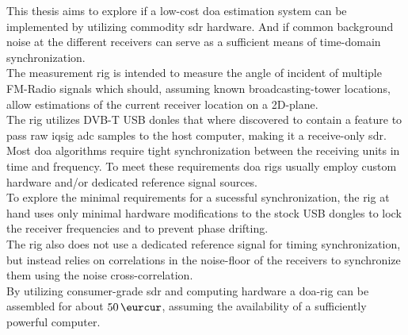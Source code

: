 This thesis aims to explore if a low-cost \gls{doa} estimation
system can be implemented by utilizing commodity \gls{sdr} hardware.
And if common background noise at the different receivers can serve
as a sufficient means of time-domain synchronization. \\

The measurement rig is intended to measure the angle of incident
of multiple FM-Radio signals which should, assuming known broadcasting-tower
locations, allow estimations of the current receiver location on
a 2D-plane. \\

The rig utilizes DVB-T USB donles that where discovered \cite{rtlhistory}
to contain a feature to pass raw \acrshort{iqsig} \acrshort{adc} samples
to the host computer, making it a receive-only \gls{sdr}. \\

Most \gls{doa} algorithms require tight synchronization between
the receiving units in time and frequency. To meet these requirements
\gls{doa} rigs usually employ custom hardware and/or dedicated
reference signal sources. \\

To explore the minimal requirements for a sucessful synchronization,
the rig at hand uses only minimal hardware modifications to
the stock USB dongles to lock the receiver
frequencies and to prevent phase drifting. \\

The rig also does not use a dedicated reference signal
for timing synchronization, but instead relies on correlations
in the noise-floor of the receivers to synchronize them
using the noise cross-correlation. \\

By utilizing consumer-grade \gls{sdr} and computing hardware
a \gls{doa}-rig can be assembled for about $\SI{50}{\eurcur}$,
assuming the availability of a sufficiently powerful computer.
